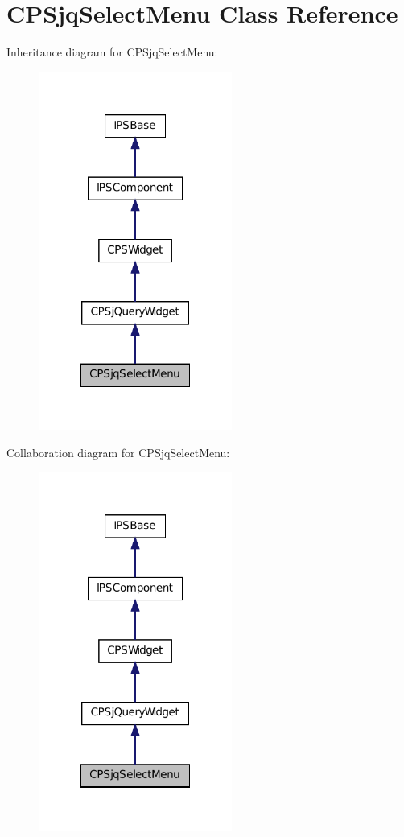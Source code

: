 \hypertarget{classCPSjqSelectMenu}{
\section{CPSjqSelectMenu Class Reference}
\label{classCPSjqSelectMenu}
}


Inheritance diagram for CPSjqSelectMenu:\nopagebreak
\begin{figure}[H]
\begin{center}
\leavevmode
\includegraphics[width=180pt]{classCPSjqSelectMenu__inherit__graph}
\end{center}
\end{figure}


Collaboration diagram for CPSjqSelectMenu:\nopagebreak
\begin{figure}[H]
\begin{center}
\leavevmode
\includegraphics[width=180pt]{classCPSjqSelectMenu__coll__graph}
\end{center}
\end{figure}

